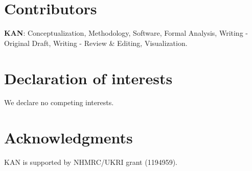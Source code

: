 \documentclass[preprint,12pt]{elsarticle}
\begin{document}






\section*{Contributors}\label{sec:credit}
\textbf{KAN}: Conceptualization, Methodology, Software, Formal Analysis, Writing - Original Draft, Writing - Review \& Editing, Visualization.

\section*{Declaration of interests}\label{sec:dec}
We declare no competing interests.

\section*{Acknowledgments}\label{sec:ak}
KAN is supported by NHMRC/UKRI grant (1194959).



\end{document}
